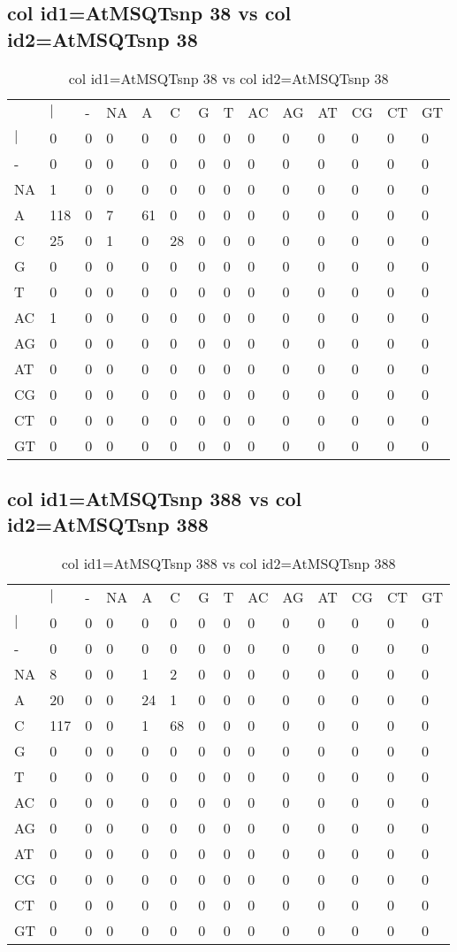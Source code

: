 \subsection{col id1=AtMSQTsnp 38 vs col id2=AtMSQTsnp 38}
\begin{center}
\begin{longtable}{|l|l|l|l|l|l|l|l|l|l|l|l|l|l|}
\caption{col id1=AtMSQTsnp 38 vs col id2=AtMSQTsnp 38} \label{table_dm696}\\
\hline
\\
\hline
&$|$&-&NA&A&C&G&T&AC&AG&AT&CG&CT&GT\\
$|$&0&0&0&0&0&0&0&0&0&0&0&0&0\\
-&0&0&0&0&0&0&0&0&0&0&0&0&0\\
NA&1&0&0&0&0&0&0&0&0&0&0&0&0\\
A&118&0&7&61&0&0&0&0&0&0&0&0&0\\
C&25&0&1&0&28&0&0&0&0&0&0&0&0\\
G&0&0&0&0&0&0&0&0&0&0&0&0&0\\
T&0&0&0&0&0&0&0&0&0&0&0&0&0\\
AC&1&0&0&0&0&0&0&0&0&0&0&0&0\\
AG&0&0&0&0&0&0&0&0&0&0&0&0&0\\
AT&0&0&0&0&0&0&0&0&0&0&0&0&0\\
CG&0&0&0&0&0&0&0&0&0&0&0&0&0\\
CT&0&0&0&0&0&0&0&0&0&0&0&0&0\\
GT&0&0&0&0&0&0&0&0&0&0&0&0&0\\
\hline
\end{longtable}
\end{center}

\subsection{col id1=AtMSQTsnp 388 vs col id2=AtMSQTsnp 388}
\begin{center}
\begin{longtable}{|l|l|l|l|l|l|l|l|l|l|l|l|l|l|}
\caption{col id1=AtMSQTsnp 388 vs col id2=AtMSQTsnp 388} \label{table_dm698}\\
\hline
\\
\hline
&$|$&-&NA&A&C&G&T&AC&AG&AT&CG&CT&GT\\
$|$&0&0&0&0&0&0&0&0&0&0&0&0&0\\
-&0&0&0&0&0&0&0&0&0&0&0&0&0\\
NA&8&0&0&1&2&0&0&0&0&0&0&0&0\\
A&20&0&0&24&1&0&0&0&0&0&0&0&0\\
C&117&0&0&1&68&0&0&0&0&0&0&0&0\\
G&0&0&0&0&0&0&0&0&0&0&0&0&0\\
T&0&0&0&0&0&0&0&0&0&0&0&0&0\\
AC&0&0&0&0&0&0&0&0&0&0&0&0&0\\
AG&0&0&0&0&0&0&0&0&0&0&0&0&0\\
AT&0&0&0&0&0&0&0&0&0&0&0&0&0\\
CG&0&0&0&0&0&0&0&0&0&0&0&0&0\\
CT&0&0&0&0&0&0&0&0&0&0&0&0&0\\
GT&0&0&0&0&0&0&0&0&0&0&0&0&0\\
\hline
\end{longtable}
\end{center}


